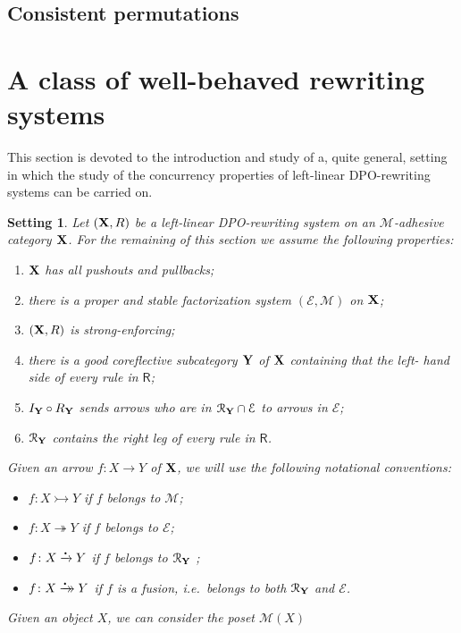 \documentclass[a4paper,UKenglish,cleveref,pdftex,thm-restate,numberwithinsect]{lipics-v2021}
\newcommand{\xrightarrowdbl}[2][]{%
	\xrightarrow[#1]{#2}\mathrel{\mkern-14mu}\rightarrow
}
\newcommand{\mini}[0]{\scalebox{.4}{$\bullet$}}
\newcommand{\rto}[0]{\xrightarrow{\mini}}
\newcommand{\fto}[0]{\xrightarrowdbl{\mini}}
\newcommand{\eto}[0]{\twoheadrightarrow}
\newcommand{\zfuse}[0]{\ensuremath{\mathcal{M}}}
\newcommand{\fuse}[1]{\ensuremath{\zfuse({#1})}}
\newcommand{\mto}[0]{\rightarrowtail}
\def\R{\mathsf{R}}
\def\X{\textbf {\textup{X}}}
\def\Y{\textbf {\textup{Y}}}
\newtheorem*{setting}{Setting}
\begin{document}
\subsection{Consistent permutations}

\section{A class of well-behaved rewriting systems}
\label{sec:rewr}

This section is devoted to the introduction and study of a, quite general, setting in which the study of the concurrency properties of left-linear DPO-rewriting systems can be carried on.

\begin{setting}Let $(\X, \R)$ be a left-linear DPO-rewriting system on an $\mathcal{M}$-adhesive category $\X$. For the remaining of this section we assume the following properties:
	\begin{enumerate}
		\item $\X$ has all pushouts and pullbacks;
		\item there is a proper and stable factorization system $(\mathcal{E}, \mathcal{M})$ on $\X$;
		\item $(\X, \R)$ is strong-enforcing;
		\item there is a good coreflective subcategory $\Y$ of $\X$ containing that the left- hand side of every rule in $\R$;
		\item $ I_{\Y}\circ R_{\Y}$ sends arrows who are in  $\mathcal{R}_\Y\cap \mathcal{E}$ to arrows in $\mathcal{E}$;
		\item $\mathcal{R}_\Y $ contains the right leg of every rule in $\R$.
	\end{enumerate}
	
	Given an arrow $f\colon X\to Y$ of $\X$,  we will use the following notational conventions:
	\begin{itemize}
		\item $f\colon X\mto Y$ if $f$ belongs to $\mathcal{M}$;
		\item $f\colon X\eto Y$ if $f$ belongs to $\mathcal{E}$;
		\item $f\colon X \rto Y$ if $f$ belongs to $\mathcal{R}_\Y$ ;
		\item $f\colon X \fto Y$ if $f$ is a \emph{fusion}, i.e.~belongs to both $\mathcal{R}_\Y$ and $\mathcal{E}$. 
		\end{itemize}
		
		
		Given an object $X$, we can consider the poset $\fuse{X}$
\end{setting}
\end{document}
